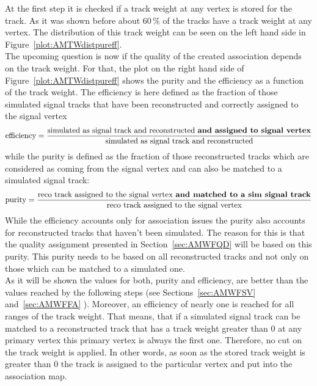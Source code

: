 At the first step it is checked if a track weight at any vertex is stored for the track.  As it was shown before about $60\,\%$ of the tracks have a track weight at any vertex. The distribution of this track weight can be seen on the left hand side in Figure~\ref{plot:AMTWdistpureff}. \\
The upcoming question is now if the quality of the created association depends on the track weight. For that, the plot on the right hand side of Figure~\ref{plot:AMTWdistpureff} shows the purity and the efficiency as a function of the track weight. The efficiency is here defined as the fraction of those simulated signal tracks that have been reconstructed and correctly assigned to the signal vertex
\begin{equation}
\textrm{efficiency} = \frac{\textrm{simulated as signal track and reconstructed \textbf{and assigned to signal vertex}}}{\textrm{simulated as signal track and reconstructed}}
\label{eq:Efficiency}
\end{equation}
while the purity is defined as the fraction of those reconstructed tracks which are considered as coming from the signal vertex and can also be matched to a simulated signal track:
\begin{equation}
\textrm{purity} = \frac{\textrm{reco track assigned to the signal vertex \textbf{and matched to a sim signal track}}}{\textrm{reco track assigned to the signal vertex}}
\label{eq:Purity}
\end{equation}
While the efficiency accounts only for association issues the purity also accounts for reconstructed tracks that haven't been simulated. The reason for this is that the quality assignment presented in Section~\ref{sec:AMWFQD} will be based on this purity. This purity needs to be based on all reconstructed tracks and not only on those which can be matched to a simulated one. \\ 
As it will be shown the values for both, purity and efficiency, are better than the values reached by the following steps (see Sections~\ref{sec:AMWFSV} and~\ref{sec:AMWFFA} ). Moreover, an efficiency of nearly one is reached for all ranges of the track weight. That means, that if a simulated signal track can be matched to a reconstructed track that has a track weight greater than 0 at any primary vertex this primary vertex is always the first one. Therefore, no cut on the track weight is applied. In other words, as soon as the stored track weight is greater than 0 the track is assigned to the particular vertex and put into the association map.


